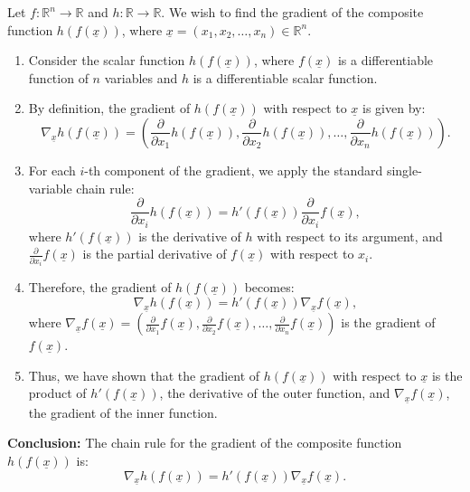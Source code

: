     \begin{derivation}
        Let \( f: \mathbb{R}^n \to \mathbb{R} \) and \( h: \mathbb{R} \to \mathbb{R} \). We wish to find the gradient of the composite function \( h(f(\underline{x})) \), where \( \underline{x} = (x_1, x_2, \dots, x_n) \in \mathbb{R}^n \).

        \begin{enumerate}
            \item Consider the scalar function \( h(f(\underline{x})) \), where \( f(\underline{x}) \) is a differentiable function of \( n \) variables and \( h \) is a differentiable scalar function.
            
            \item By definition, the gradient of \( h(f(\underline{x})) \) with respect to \( \underline{x} \) is given by:
            \[
            \nabla_{\underline{x}} h(f(\underline{x})) = \left( \frac{\partial}{\partial x_1} h(f(\underline{x})), \frac{\partial}{\partial x_2} h(f(\underline{x})), \dots, \frac{\partial}{\partial x_n} h(f(\underline{x})) \right).
            \]
            
            \item For each \( i \)-th component of the gradient, we apply the standard single-variable chain rule:
            \[
            \frac{\partial}{\partial x_i} h(f(\underline{x})) = h'(f(\underline{x})) \frac{\partial}{\partial x_i} f(\underline{x}),
            \]
            where \( h'(f(\underline{x})) \) is the derivative of \( h \) with respect to its argument, and \( \frac{\partial}{\partial x_i} f(\underline{x}) \) is the partial derivative of \( f(\underline{x}) \) with respect to \( x_i \).

            \item Therefore, the gradient of \( h(f(\underline{x})) \) becomes:
            \[
            \nabla_{\underline{x}} h(f(\underline{x})) = h'(f(\underline{x})) \nabla_{\underline{x}} f(\underline{x}),
            \]
            where \( \nabla_{\underline{x}} f(\underline{x}) = \left( \frac{\partial}{\partial x_1} f(\underline{x}), \frac{\partial}{\partial x_2} f(\underline{x}), \dots, \frac{\partial}{\partial x_n} f(\underline{x}) \right) \) is the gradient of \( f(\underline{x}) \).

            \item Thus, we have shown that the gradient of \( h(f(\underline{x})) \) with respect to \( \underline{x} \) is the product of \( h'(f(\underline{x})) \), the derivative of the outer function, and \( \nabla_{\underline{x}} f(\underline{x}) \), the gradient of the inner function.
        \end{enumerate}

        \textbf{Conclusion:} The chain rule for the gradient of the composite function \( h(f(\underline{x})) \) is:
        \[
        \nabla_{\underline{x}} h(f(\underline{x})) = h'(f(\underline{x})) \nabla_{\underline{x}} f(\underline{x}).
        \]
    \end{derivation}

